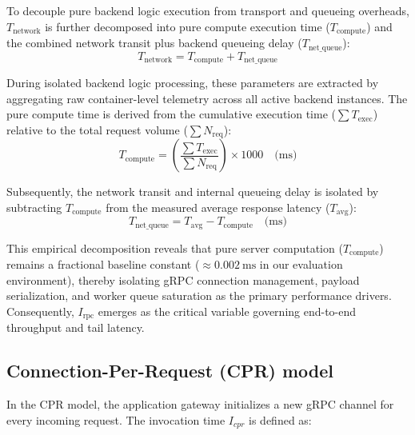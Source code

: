 \documentclass{ieeeaccess}
\begin{document}
	To decouple pure backend logic execution from transport and queueing overheads, $T_{\text{network}}$ is further decomposed into pure compute execution time ($T_{\text{compute}}$) and the combined network transit plus backend queueing delay ($T_{\text{net\_queue}}$):
	\begin{equation}
		T_{\text{network}} = T_{\text{compute}} + T_{\text{net\_queue}}
	\end{equation}
	
	During isolated backend logic processing, these parameters are extracted by aggregating raw container-level telemetry across all active backend instances. The pure compute time is derived from the cumulative execution time ($\sum T_{\text{exec}}$) relative to the total request volume ($\sum N_{\text{req}}$):
	\begin{equation}
		\label{eq:t-comp}
		T_{\text{compute}} = \left( \frac{\sum T_{\text{exec}}}{\sum N_{\text{req}}} \right) \times 1000 \quad \text{(ms)}
	\end{equation}
	
	Subsequently, the network transit and internal queueing delay is isolated by subtracting $T_{\text{compute}}$ from the measured average response latency ($T_{\text{avg}}$):
	\begin{equation}
		\label{eq:t-net}
		T_{\text{net\_queue}} = T_{\text{avg}} - T_{\text{compute}} \quad \text{(ms)}
	\end{equation}
	
	This empirical decomposition reveals that pure server computation ($T_{\text{compute}}$) remains a fractional baseline constant ($\approx 0.002\ \text{ms}$ in our evaluation environment), thereby isolating gRPC connection management, payload serialization, and worker queue saturation as the primary performance drivers. Consequently, $I_{\text{rpc}}$ emerges as the critical variable governing end-to-end throughput and tail latency. 
	
	
	
	
	
	\subsection{Connection-Per-Request (CPR) model}
	\label{sec2.1}
	
	In the CPR model, the application gateway initializes a new gRPC channel for every incoming request.  The invocation time $I_{cpr}$ is defined as:
	
\end{document}
